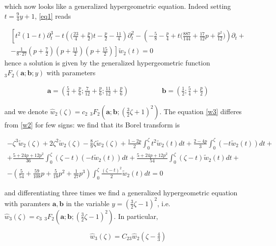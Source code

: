 \documentclass{article}
\begin{document}
which now looks like a generalized hypergeometric equation. Indeed setting $t=\tfrac{9}{4}y+1$, \eqref{eq1} reads

\begin{multline}
\left[t^2(1-t)\partial_t^3-t\left(\big(\frac{23}{4}+\frac{p}{2}\big)t-\frac{p}{2}-\frac{11}{4}\right)\partial_t^2-\left(-\frac{5}{8}-\frac{p}{4}+t\Big(\frac{887}{144}+\frac{17}{12}p+\frac{p^2}{12}\Big)\right)\partial_t +\right.\\
\left. -\frac{1}{8\cdot 27}\left(p+\frac{7}{2}\right)\left(p+\frac{11}{2}\right)\left(p+\frac{15}{2}\right)\right]\tilde{w}_2(t)=0
\end{multline}
hence a solution is given by the generalized hypergeometric function ${}_3F_2\left(\mathbf{a};\mathbf{b};y\right)$ with parameters

\begin{align*}
\mathbf{a}=\left(\frac{5}{4}+\frac{p}{6};\frac{7}{12}+\frac{p}{6};\frac{11}{12}+\frac{p}{6}\right) & \qquad\qquad \mathbf{b}=\left(\frac{1}{2};\frac{5}{4}+\frac{p}{2}\right)
\end{align*}

and we denote $\hat{w}_2(\zeta)=c_2\,\, {}_3F_2\left(\mathbf{a};\mathbf{b};\left(\tfrac{3}{2}\zeta+1\right)^2\right)$. The equation \eqref{w3} differes from \eqref{w2} for few signs: we find that its Borel transform is 

\begin{multline}
-\zeta^3\tilde{w}_2(\zeta)+2\zeta^2\tilde{w}_2(\zeta)-\frac{8}{9}\zeta\tilde{w}_2(\zeta)+\frac{1-2p}{2}\int_0^\zeta t^2\tilde{w}_2(t)dt+\frac{2-4p}{3}\int_0^\zeta(-t\tilde{w}_2(t))dt+\\
+\frac{5+24p+12p^2}{36}\int_0^\zeta(\zeta-t)(-t\tilde{w}_2(t))dt
+\frac{5+24p+12p^2}{54}\int_0^\zeta(\zeta-t)\tilde{w}_2(t)dt +\\
-\left(\frac{5}{54}+\frac{59}{108}p+\frac{5}{18}p^2+\frac{1}{27}p^3\right)\int_0^\zeta\frac{(\zeta-t)^2}{2}\tilde{w}_2(t)dt=0
\end{multline}

and differentiating three times we find a generalized hypergeometric equation with paramters $\mathbf{a},\mathbf{b}$ in the variable $y=\left(\tfrac{3}{2}\zeta-1\right)^2$, i.e. $\hat{w}_3(\zeta)= c_3\,\, {}_3F_2\left(\mathbf{a};\mathbf{b};\left(\tfrac{3}{2}\zeta-1\right)^2\right)$. In particular, 

\begin{equation}
\hat{w}_3(\zeta)=C_{23}\hat{w}_2(\zeta-\tfrac{4}{3})
\end{equation}
\end{document}
